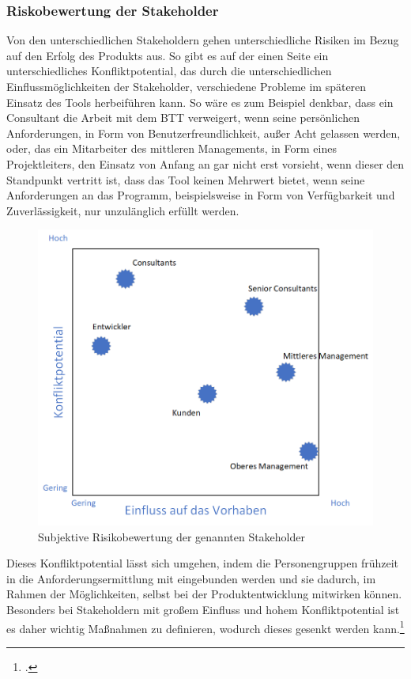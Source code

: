 \subsubsection{Riskobewertung der Stakeholder}
Von den unterschiedlichen Stakeholdern gehen unterschiedliche Risiken im Bezug auf den Erfolg des Produkts aus. So gibt es auf der einen Seite ein unterschiedliches Konfliktpotential, das durch die unterschiedlichen Einflussmöglichkeiten der Stakeholder, verschiedene Probleme im späteren Einsatz des Tools herbeiführen kann. So wäre es zum Beispiel denkbar, dass ein Consultant die Arbeit mit dem BTT verweigert, wenn seine persönlichen Anforderungen, in Form von Benutzerfreundlichkeit, außer Acht gelassen werden, oder, das ein Mitarbeiter des mittleren Managements, in Form eines Projektleiters, den Einsatz von Anfang an gar nicht erst vorsieht, wenn dieser den Standpunkt vertritt ist, dass das Tool keinen Mehrwert bietet, wenn seine Anforderungen an das Programm, beispielsweise in Form von Verfügbarkeit und Zuverlässigkeit, nur unzulänglich erfüllt werden.
\begin{figure}[ht]
    \centering
    \includegraphics[scale=0.67]{Bilder/stakeholderRisiko.png}
    \caption[Risikobewertung der Stakeholder]{Subjektive Risikobewertung der genannten Stakeholder}
\end{figure}
Dieses Konfliktpotential lässt sich umgehen, indem die Personengruppen frühzeit in die Anforderungsermittlung mit eingebunden werden und sie dadurch, im Rahmen der Möglichkeiten, selbst bei der Produktentwicklung mitwirken können. Besonders bei Stakeholdern mit großem Einfluss und hohem Konfliktpotential ist es daher wichtig Maßnahmen zu definieren, wodurch dieses gesenkt werden kann.\footcite[Vgl.][S. 504 f.]{balzert}

